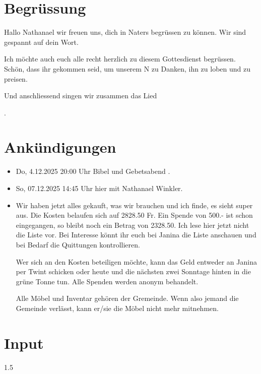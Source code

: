 \documentclass{mybib}
\begin{document}
\section{Begrüssung}
Hallo Nathanael wir freuen uns, dich in Naters begrüssen zu können. Wir sind gespannt auf dein Wort.

Ich möchte auch euch alle recht herzlich zu diesem Gottesdienst begrüssen. Schön, dass ihr gekommen seid, um unserem \herr N zu Danken, ihn zu loben und zu preisen.

\beten[b, p]{} Und anschliessend singen wir zusammen das Lied

{}.

\section{Ankündigungen}
\begin{itemize}
    \item {} Do, 4.12.2025 20:00 Uhr Bibel und Gebetsabend .
    \item {} So, 07.12.2025 14:45 Uhr hier mit Nathanael Winkler.
    
    \item {} Wir haben jetzt alles gekauft, was wir brauchen und ich finde, es sieht super aus. Die Kosten belaufen sich auf 2828.50 Fr. Ein Spende von 500.- ist schon eingegangen, so bleibt noch ein Betrag von 2328.50. Ich lese hier jetzt nicht die Liste vor. Bei Interesse könnt ihr euch bei Janina die Liste anschauen und bei Bedarf die Quittungen kontrollieren. 
    
    Wer sich an den Kosten beteiligen möchte, kann das Geld entweder an Janina per Twint schicken oder heute und die nächsten zwei Sonntage hinten in die grüne Tonne tun. Alle Spenden werden anonym behandelt.
    
    Alle Möbel und Inventar gehören der Gremeinde. Wenn also jemand die Gemeinde verlässt, kann er/sie die Möbel nicht mehr mitnehmen.
\end{itemize}

\section{ Input }
\begin{spacing}{1.5}
    
   
\end{spacing}
\end{document}
